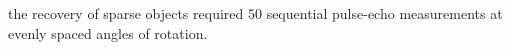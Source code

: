 the recovery of
sparse objects required
$50$ sequential pulse-echo measurements at
evenly spaced angles of
rotation.
